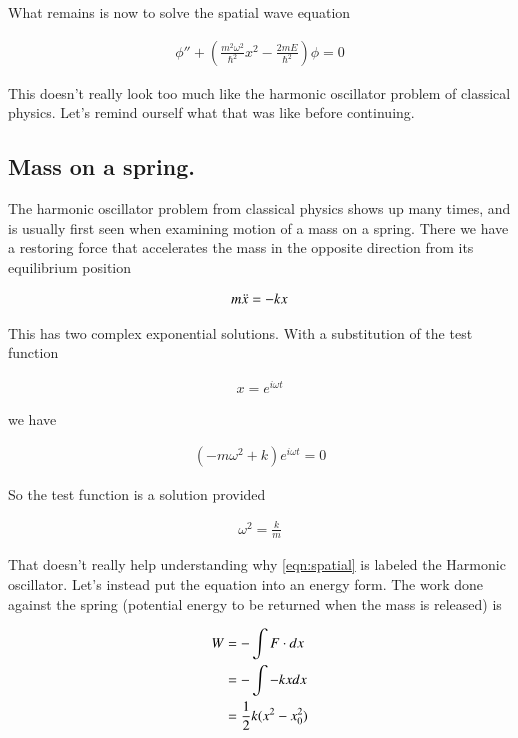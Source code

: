 \documentclass{article}
\begin{document}
What remains is now to solve the spatial wave equation

\begin{align}\label{eqn:spatial}
\phi'' + \left( \frac{m^2 \omega^2}{\hbar^2} x^2 - \frac{2m E}{\hbar^2}\right) \phi = 0
\end{align}

This doesn't really look too much like the harmonic oscillator problem of classical physics.  Let's remind ourself
what that was like before continuing.

\subsection{ Mass on a spring. }

The harmonic oscillator problem from classical physics
shows up many times, and is usually first seen when examining motion
of a mass on a spring.  There we have a restoring force that accelerates the
mass in the opposite direction from its equilibrium position

\begin{align}
m \ddot{x} = -k x
\end{align}

This has two complex exponential solutions.  With a substitution of the test function

\begin{align*}
x = e^{i \omega t}
\end{align*}

we have

\begin{align*}
(-m \omega^2 + k) e^{i \omega t} = 0
\end{align*}

So the test function is a solution provided

\begin{align*}
\omega^2 = \frac{k}{m}
\end{align*}

That doesn't really help understanding why \ref{eqn:spatial} is labeled the Harmonic oscillator.  Let's instead put the equation into an energy form.  The work done against the spring
(potential energy to be returned when the mass is released) is

\begin{align*}
W 
&= - \int F \cdot dx \\
&= - \int -kx dx \\
&= \frac{1}{2} k (x^2 - x_0^2)
\end{align*}
\end{document}
